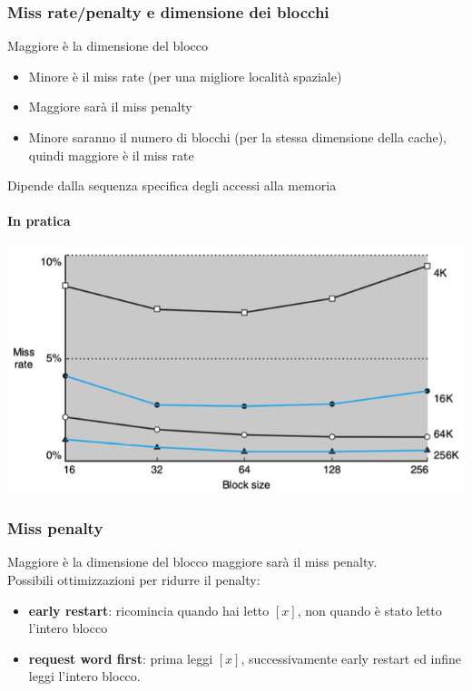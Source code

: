 \documentclass[12pt,a4paper]{article}
\begin{document}
\subsubsection{Miss rate/penalty e dimensione dei blocchi}
Maggiore è la dimensione del blocco
\begin{itemize}
\item Minore è il miss rate (per una migliore località spaziale)
\item Maggiore sarà il miss penalty
\item Minore saranno il numero di blocchi (per la stessa dimensione della cache), quindi maggiore è il miss rate
\end{itemize}
Dipende dalla sequenza specifica degli accessi alla memoria
\paragraph{In pratica}
\begin{center}
\includegraphics[width=0.6\columnwidth]{img/miss_rate-penalty.png}
\end{center}

\subsubsection{Miss penalty}
Maggiore è la dimensione del blocco maggiore sarà il miss penalty.\\
Possibili ottimizzazioni per ridurre il penalty:
\begin{itemize}
\item \textbf{early restart}: ricomincia quando hai letto $[x]$, non quando è stato letto l'intero blocco
\item \textbf{request word first}: prima leggi $[x]$, successivamente early restart ed infine leggi l'intero blocco.
\end{itemize}
\end{document}
